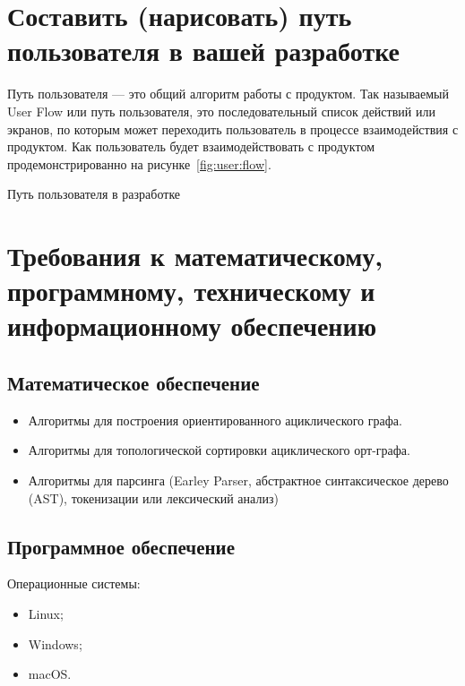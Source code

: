 \section{Составить (нарисовать) путь пользователя в вашей разработке}

Путь пользователя --- это общий алгоритм работы с продуктом. Так
называемый User Flow или путь пользователя, это последовательный
список действий или экранов, по которым может переходить
пользователь в процессе взаимодействия с продуктом.
Как пользователь будет взаимодействовать с продуктом
продемонстрированно на рисунке~\ref{fig:user:flow}.

\begin{image}
	\caption{Путь пользователя в разработке}
	\label{fig:user:flow}
\end{image}

\section{Требования к математическому, программному,
	техническому и информационному обеспечению}

\subsection{Математическое обеспечение}

\begin{itemize}
	\item Алгоритмы для построения ориентированного ациклического графа.
	\item Алгоритмы для топологической сортировки ациклического орт-графа.
	\item Алгоритмы для парсинга
		(Earley Parser, абстрактное синтаксическое дерево (AST),
		токенизации или лексический анализ)
\end{itemize}

\subsection{Программное обеспечение}

Операционные системы:

\begin{itemize}
	\item Linux;
	\item Windows;
	\item macOS.
\end{itemize}

